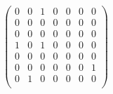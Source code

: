 \begin{prob}
\begin{subprobset}
\begin{subprob}
            \begin{soln}

                \[
                \begin{pmatrix}
                    0 & 0 & 1 & 0 & 0 & 0 & 0 \\
                    0 & 0 & 0 & 0 & 0 & 0 & 0 \\
                    0 & 0 & 0 & 0 & 0 & 0 & 0 \\
                    1 & 0 & 1 & 0 & 0 & 0 & 0 \\
                    0 & 0 & 0 & 0 & 0 & 0 & 0 \\
                    0 & 0 & 0 & 0 & 0 & 0 & 1 \\
                    0 & 1 & 0 & 0 & 0 & 0 & 0 \\
                \end{pmatrix}
                \]

            \end{soln}
            
        \end{subprob}

    \end{subprobset}
\end{prob}
